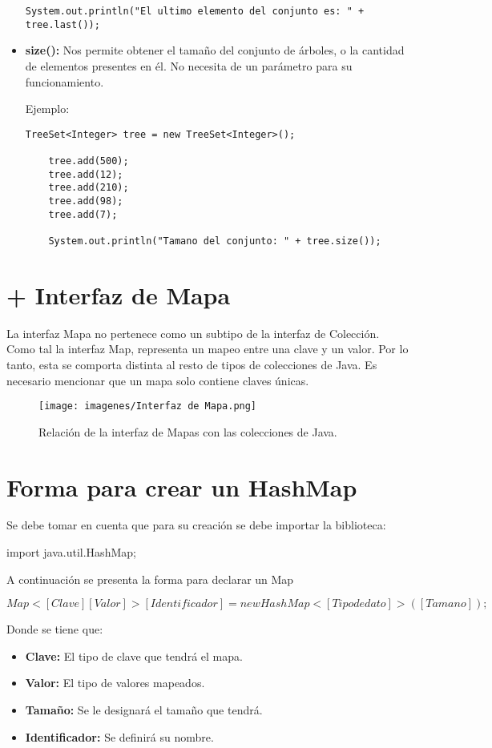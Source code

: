\documentclass[12pt, letterpaper]{article} %
\begin{document}
\begin{itemize}
\begin{lstlisting}[frame=single]
    System.out.println("El ultimo elemento del conjunto es: " + tree.last());
    \end{lstlisting}

    \item \textbf{size():} Nos permite obtener el tamaño del conjunto de árboles, o la cantidad de elementos presentes en él. No necesita de un parámetro para su funcionamiento.

    Ejemplo:
    \lstset{language = Java, breaklines=true, basicstyle=\footnotesize}
    \begin{lstlisting}[frame=single]
    TreeSet<Integer> tree = new TreeSet<Integer>();

    tree.add(500);
    tree.add(12);
    tree.add(210);
    tree.add(98);
    tree.add(7);

    System.out.println("Tamano del conjunto: " + tree.size());
    \end{lstlisting}
\end{itemize}

\section*{+ Interfaz de Mapa}
La interfaz Mapa no pertenece como un subtipo de la interfaz de Colección. Como tal la interfaz Map, representa un mapeo entre una clave y un valor. Por lo tanto, esta se comporta distinta al resto de tipos de colecciones de Java. Es necesario mencionar que un mapa solo contiene claves únicas.

\begin{figure}[h]
    \centering
    \texttt{[image: imagenes/Interfaz de Mapa.png]}
    \caption{Relación de la interfaz de Mapas con las colecciones de Java.}
    \label{fig:IMapa}
\end{figure}

\section*{Forma para crear un HashMap}
Se debe tomar en cuenta que para su creación se debe importar la biblioteca:
\begin{center}
    import java.util.HashMap;
\end{center}
A continuación se presenta la forma para declarar un Map

\begin{center}
    $Map<[Clave][Valor]> [Identificador] = new HashMap<[Tipo de dato]>([Tamano]);$
\end{center}
Donde se tiene que:
\begin{itemize}
    \item \textbf{Clave:} El tipo de clave que tendrá el mapa.
    \item \textbf{Valor:}  El tipo de valores mapeados.
    \item \textbf{Tamaño:} Se le designará el tamaño que tendrá.
    \item \textbf{Identificador:} Se definirá su nombre.
\end{itemize}
\end{document}
